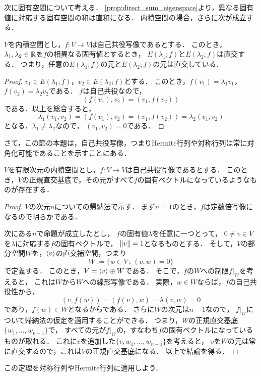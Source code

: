 次に固有空間について考える．
\cref{prop:direct_sum_eigenspace}より，異なる固有値に対応する固有空間の和は直和になる．
内積空間の場合，さらに次が成立する．
\begin{prop}\label{prop:eigenspace_perp}
  $V$を内積空間とし，$f \colon V \to V$は自己共役写像であるとする．
  このとき，$\lambda_1,\lambda_2 \in \mathbb{R}$を$f$の相異なる固有値とするとき，
  $E(\lambda_1;f)$と$E(\lambda_2;f)$は直交する．
  つまり，任意の$E(\lambda_1;f)$の元と$E(\lambda_2;f)$の元は直交している．
\end{prop}
\begin{proof}
$v_1 \in E(\lambda_1;f)$，$v_2 \in E(\lambda_2;f)$とする．
このとき，$f(v_1)=\lambda_1 v_1$，$f(v_2)=\lambda_2 v_2$である．
$f$は自己共役なので，
\[
    (f(v_1),v_2) = (v_1,f(v_2))
\]
である．以上を総合すると，
\[
    \lambda_1 (v_1,v_2) 
    = (f(v_1),v_2) 
    = (v_1,f(v_2))
    = \lambda_2 (v_1,v_2)
\]
となる．$\lambda_1 \neq \lambda_2$なので，
$(v_1,v_2)=0$である．
\end{proof}
さて，この節の本題は，自己共役写像，つまりHermite行列や対称行列は常に対角化可能であることを示すことにある．
\begin{thm}\label{thm:self-adjoint-diagonalize}
  $V$を有限次元の内積空間とし，$f \colon V \to V$は自己共役写像であるとする．
  このとき，$V$の正規直交基底で，その元がすべて$f$の固有ベクトルになっているようなものが存在する．
\end{thm}
\begin{proof}
$V$の次元$n$についての帰納法で示す．
まず$n=1$のとき，$f$は定数倍写像になるので明らかである．

次にある$n$で命題が成立したとし，
$f$の固有値$\lambda$を任意に一つとって，
$0 \neq v \in V$を$\lambda$に対応する$f$の固有ベクトルで，
$\left\| v \right\|=1$となるものとする．
そして，$V$の部分空間$W$を，$\left\langle v \right\rangle$の直交補空間，つまり
\[
    W := \{w \in V\,;\, (v,w) = 0\}
\]
で定義する．
このとき，$V = \left\langle v \right\rangle \oplus W$である．
そこで，$f$の$W$への制限$f|_W$を考えると，
これは$W$から$W$への線形写像である．
実際，$w \in W$ならば，$f$の自己共役性から，
\[
    (v,f(w))=(f(v),w)=\lambda(v,w) = 0
\]
であり，$f(w) \in W$となるからである．
さらに$W$の次元は$n-1$なので，
$f|_W$について帰納法の仮定を適用することができる．
つまり，$W$の正規直交基底$\{w_1,\dots,w_{n-1}\}$で，
すべての元が$f|_W$の，すなわち$f$の固有ベクトルになっているものが取れる．
これに$v$を追加した$\{v,w_1,\dots,w_{n-1}\}$を考えると，
$v$を$W$の元は常に直交するので，これは$V$の正規直交基底になる．
以上で結論を得る．
\end{proof}
この定理を対称行列やHermite行列に適用しよう．
